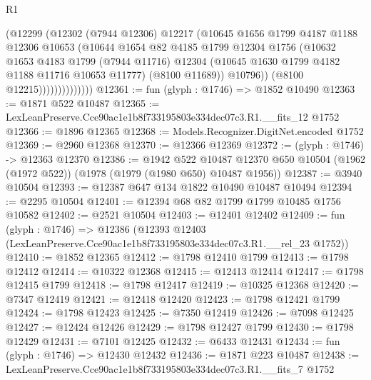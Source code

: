 \begin{lexlean}{R1}
\begin{coremodule}
                          (@12299
                            (@12302
                              (@7944 @12306)
                              @12217
                              (@10645
                                @1656
                                @1799
                                @4187
                                @1188
                                @12306
                                @10653
                                (@10644
                                  @1654
                                  @82
                                  @4185
                                  @1799
                                  @12304
                                  @1756
                                  (@10632
                                    @1653
                                    @4183
                                    @1799
                                    (@7944 @11716)
                                    @12304
                                    (@10645 @1630 @1799 @4182 @1188 @11716 @10653 @11777)
                                    (@8100 @11689))
                                  @10796))
                              (@8100 @12215))))))))))))))
@12361 := fun (glyph : @1746) => @1852 @10490
@12363 := @1871 @522 @10487
@12365 := LexLeanPreserve.Cce90ac1e1b8f733195803e334dec07c3.R1.__fits_12 @1752
@12366 := @1896 @12365
@12368 := Models.Recognizer.DigitNet.encoded @1752
@12369 := @2960 @12368
@12370 := @12366 @12369
@12372 := (glyph : @1746) -> @12363 @12370
@12386 := @1942
    @522
    @10487
    @12370
    @650
    @10504
    (@1962 (@1972 @522))
    (@1978 (@1979 (@1980 @650) @10487 @1956))
@12387 := @3940 @10504
@12393 := @12387 @647 @134 @1822 @10490 @10487 @10494
@12394 := @2295 @10504
@12401 := @12394 @68 @82 @1799 @1799 @10485 @1756 @10582
@12402 := @2521 @10504
@12403 := @12401 @12402
@12409 := fun (glyph : @1746) =>
  @12386 (@12393 @12403 (LexLeanPreserve.Cce90ac1e1b8f733195803e334dec07c3.R1.__rel_23 @1752))
@12410 := @1852 @12365
@12412 := @1798 @12410 @1799
@12413 := @1798 @12412
@12414 := @10322 @12368
@12415 := @12413 @12414
@12417 := @1798 @12415 @1799
@12418 := @1798 @12417
@12419 := @10325 @12368
@12420 := @7347 @12419
@12421 := @12418 @12420
@12423 := @1798 @12421 @1799
@12424 := @1798 @12423
@12425 := @7350 @12419
@12426 := @7098 @12425
@12427 := @12424 @12426
@12429 := @1798 @12427 @1799
@12430 := @1798 @12429
@12431 := @7101 @12425
@12432 := @6433 @12431
@12434 := fun (glyph : @1746) => @12430 @12432
@12436 := @1871 @223 @10487
@12438 := LexLeanPreserve.Cce90ac1e1b8f733195803e334dec07c3.R1.__fits_7 @1752

\end{coremodule}
\end{lexlean}

